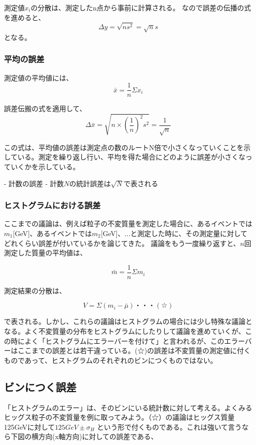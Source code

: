 測定値$x_{i}$の分散は、測定したn点から事前に計算される。
なので誤差の伝播の式を進めると、
\begin{equation}
  \Delta y=\sqrt{ns^2}=\sqrt{n}s
\end{equation}
となる。

\subsubsection{平均の誤差}
測定値の平均値には、
\begin{equation}
  \bar{x}=\frac{1}{n}\Sigma x_i
\end{equation}

誤差伝搬の式を適用して、
\begin{equation}
  \Delta \bar{x} = \sqrt{n\times\left(\frac{1}{n}\right)^2s^2}=\frac{1}{\sqrt{n}}
\end{equation}

この式は、平均値の誤差は測定点の数のルートN倍で小さくなっていくことを示している。測定を繰り返し行い、平均を得た場合にどのように誤差が小さくなっていくかを示している。

- 計数の誤差
- 計数$N$の統計誤差は$\sqrt{N}$で表される

\subsubsection{ヒストグラムにおける誤差}
ここまでの議論は、例えば粒子の不変質量を測定した場合に、あるイベントでは$m_1$[GeV]、あるイベントでは$m_2$[GeV]、...と測定した時に、その測定量に対してどれくらい誤差が付いているかを論じてきた。
議論をもう一度繰り返すと、$n$回測定した質量の平均値は、

\begin{equation}
  \bar{m}=\frac{1}{n}\Sigma m_i
\end{equation}

測定結果の分散は、

\begin{equation}
  V=\Sigma(m_i-\bar{\mu})・・・(☆)
\end{equation}

で表される。しかし、これらの議論はヒストグラムの場合には少し特殊な議論となる。よく不変質量の分布をヒストグラムにしたりして議論を進めていくが、この時によく「ヒストグラムにエラーバーを付けて」と言われるが、このエラーバーはここまでの誤差とは若干違っている。(☆)の誤差は不変質量の測定値に付くものであって、ヒストグラムのそれぞれのビンにつくものではない。

\subsection{ビンにつく誤差}
「ヒストグラムのエラー」は、そのビンにいる統計数に対して考える。よくみるヒッグス粒子の不変質量を例に取ってみよう。（☆）の議論はヒッグス質量125GeVに対して$125GeV \pm \sigma_{H}$ という形で付くものである。これは強いて言うなら下図の横方向(x軸方向)に対しての誤差である、

